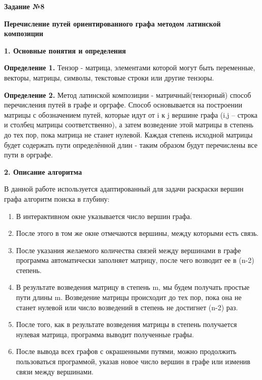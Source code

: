 \documentclass{article}
\begin{document}
\newpage
\begin{center}
	\textbf{Задание №8}
\end{center}
\begin{center}
	\textbf{Перечисление путей ориентированного графа методом латинской композиции}
\end{center}
\textbf{1. Основные понятия и определения} 
\begin{flushleft}
	\textbf{Определение 1.} Тензор - матрица, элементами которой могут быть переменные, векторы, матрицы, символы, текстовые строки или другие тензоры.
\end{flushleft}
\begin{flushleft}
	\textbf{Определение 2.} Метод латинской композиции - матричный(тензорный) способ перечисления путей в графе и орграфе. Способ основывается на построении матрицы с обозначением путей, которые идут от i к j вершине графа (i,j – строка и столбец матрицы соответственно), а затем возведение этой матрицы в степень до тех пор, пока матрица не станет нулевой. Каждая степень исходной матрицы будет содержать пути определённой длин - таким образом будут перечислены все пути в орграфе.
\end{flushleft}
\textbf{2. Описание алгоритма}
\begin{flushleft}
	В данной работе используется адаптированный для задачи раскраски вершин графа алгоритм поиска в глубину:
	\begin{enumerate}
		\item В интерактивном окне указывается число вершин графа.
		\item После этого в том же окне отмечаются вершины, между которыми есть связь.
		\item После указания желаемого количества связей между вершинами в графе программа автоматически заполняет матрицу, после чего возводит ее в (n-2) степень.
		\item В результате возведения матрицу в степень m, мы будем получать простые пути длины m. Возведение матрицы происходит до тех пор, пока она не станет нулевой или число возведений в степень не достигнет (n-2) раз.
		\item После того, как в результате возведения матрицы в степень получается нулевая матрица, программа выводит полученные графы.
		\item После вывода всех графов с окрашенными путями, можно продолжить пользоваться программой, указав новое число вершин в графе или изменив связи между вершинами.
	\end{enumerate}
\end{flushleft}
\end{document}
